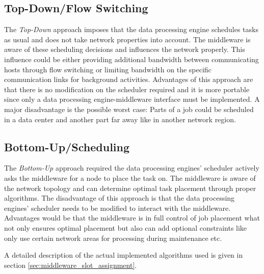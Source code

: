 \subsection{Top-Down/Flow Switching}
The \textit{Top-Down} approach imposes that the data processing engine schedules tasks as usual and
does not take network properties into account. The middleware is aware of these scheduling decisions
and influences the network properly. This influence could be either providing additional bandwidth
between communicating hosts through flow switching or limiting bandwidth on the specific
communication links for background activities. Advantages of this approach are that there is no
modification on the scheduler required and it is more portable since only a data processing
engine-middleware interface must be implemented. A major disadvantage is the possible worst case:
Parts of a job could be scheduled in a data center and another part far away like in another network
region.

\subsection{Bottom-Up/Scheduling}
The \textit{Bottom-Up} approach required the data processing engines' scheduler actively asks the
middleware for a node to place the task on. The middleware is aware of the network topology and can
determine optimal task placement through proper algorithms. The disadvantage of this approach is
that the data processing engines' scheduler needs to be modified to interact with the middleware.
Advantages would be that the middleware is in full control of job placement what not only ensures
optimal placement but also can add optional constraints like only use certain network areas for
processing during maintenance etc.

A detailed description of the actual implemented algorithms used is given in section
\ref{sec:middleware_slot_assignment}.

